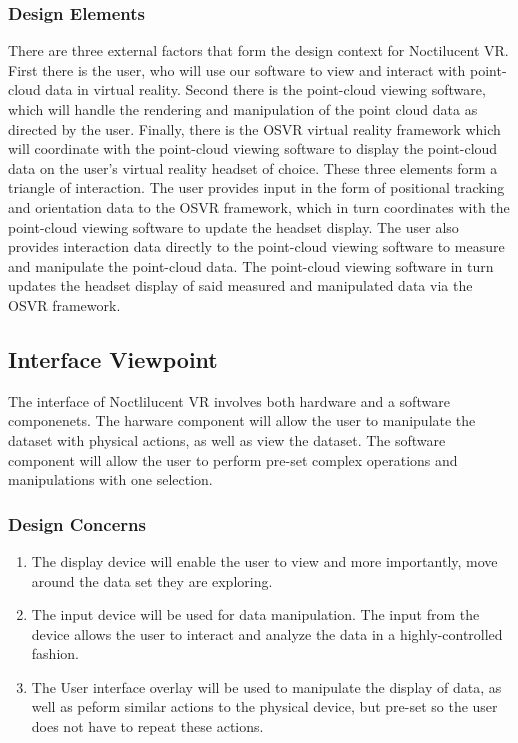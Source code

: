 \documentclass{article}
\begin{document}
\subsubsection{Design Elements}

There are three external factors that form the design context for Noctilucent VR. 
First there is the user, who will use our software to view and interact with point-cloud data in virtual reality. 
Second there is the point-cloud viewing software, which will handle the rendering and manipulation of the point cloud data as directed by the user. 
Finally, there is the OSVR virtual reality framework which will coordinate with the point-cloud viewing software to display the point-cloud data on the user’s virtual reality headset of choice. 
These three elements form a triangle of interaction. 
The user provides input in the form of positional tracking and orientation data to the OSVR framework, which in turn coordinates with the point-cloud viewing software to update the headset display. 
The user also provides interaction data directly to the point-cloud viewing software to measure and manipulate the point-cloud data. 
The point-cloud viewing software in turn updates the headset display of said measured and manipulated data via the OSVR framework.

\subsection{Interface Viewpoint}

The interface of Noctlilucent VR involves both hardware and a software componenets. 
The harware component will allow the user to manipulate the dataset with physical actions,
as well as view the dataset.
The software component will allow the user to perform pre-set complex operations and manipulations
with one selection. 

\subsubsection{Design Concerns}
\begin{enumerate}
\item The display device will enable the user to view and more importantly, move around the data set
    they are exploring.
\item The input device will be used for data manipulation. The input from the device allows the user to interact and analyze the
    data in a highly-controlled fashion.
\item The User interface overlay will be used to manipulate the display of data, as well as peform similar actions to the physical device,
    but pre-set so the user does not have to repeat these actions.
\end{enumerate}
\end{document}
